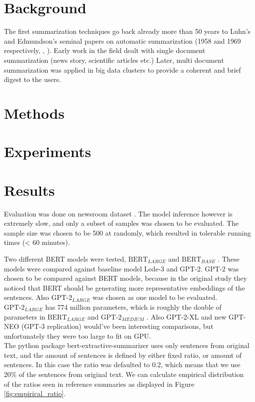 \documentclass{article}
\newcommand{\bertlarge}{$\text{BERT}_{LARGE}$ }
\newcommand{\bertbase}{$\text{BERT}_{BASE}$ }
\newcommand{\gptmedium}{$\text{GPT-2}_{MEDIUM}$ }
\newcommand{\gptlarge}{$\text{GPT-2}_{LARGE}$ }
\begin{document}
\section{Background}
The first summarization techniques go back already more than 50 years to Luhn’s and Edmundson’s seminal papers on automatic summarization (1958 and 1969 respectively, \cite{textmining1958}, \cite{automaticextracting}). Early work in the field dealt with single document summarization (news story, scientific articles etc.) Later, multi document summarization was applied in big data clusters to provide a coherent and brief digest to the users. \\



\section{Methods}


\section{Experiments}



\section{Results}

Evaluation was done on newsroom dataset \cite{dataset}. The model inference however is extremely slow, and only a subset of samples was chosen to be evaluated. The sample size was chosen to be 500 at randomly, which resulted in tolerable running times (< 60 minutes). 

\noindent
Two different BERT models were tested, \bertlarge and \bertbase. These models were compared against baseline model Lede-3 and GPT-2. GPT-2 was chosen to be compared against BERT models, because in the original study \cite{extractive_bert} they noticed that BERT should be generating more representative embeddings of the sentences. Also \gptlarge was chosen as one model to be evaluated. \gptlarge has 774 million parameters, which is roughly the double of parameters in \bertlarge and \gptmedium. Also GPT-2-XL and new GPT-NEO (GPT-3 replication) would've been interesting comparisons, but unfortunately they were too large to fit on GPU.\\

\noindent
The python package bert-extractive-summarizer \cite{extractive_bert} uses only sentences from original text, and the amount of sentences is defined by either fixed ratio, or amount of sentences. In this case the ratio was defaulted to 0.2, which means that we use 20\% of the sentences from original text. We can calculate empirical distribution of the ratios seen in reference summaries as displayed in Figure \ref{fig:empirical_ratio}.
\end{document}

